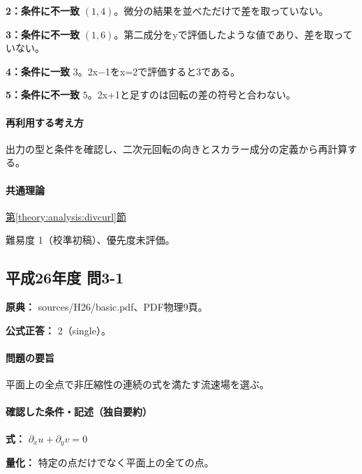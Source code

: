 \noindent\textbf{2：条件に不一致} \((1,4)\)。微分の結果を並べただけで差を取っていない。\par

\noindent\textbf{3：条件に不一致} \((1,6)\)。第二成分をyで評価したような値であり、差を取っていない。\par

\noindent\textbf{4：条件に一致} \(3\)。2x−1をx=\allowbreak{}2で評価すると3である。\par

\noindent\textbf{5：条件に不一致} \(5\)。2x+1と足すのは回転の差の符号と合わない。\par

\paragraph{再利用する考え方} 出力の型と条件を確認し、二次元回転の向きとスカラー成分の定義から再計算する。

\paragraph{共通理論} \hyperref[theory:analysis:divcurl]{第\ref*{theory:analysis:divcurl}節}

\par 難易度 1（校準初稿）、優先度未評価。

\subsection{平成26年度 問3-1}
\label{q:h26-reg-basic-3-1}

\noindent\textbf{原典：} sources/H26/basic.pdf、PDF物理9頁。

\textbf{公式正答：} 2（single）。

\paragraph{問題の要旨} 平面上の全点で非圧縮性の連続の式を満たす流速場を選ぶ。

\paragraph{確認した条件・記述（独自要約）}\mbox{}\par

\noindent\textbf{式：} \(\partial_xu+\partial_yv=0\)\par

\noindent\textbf{量化：} 特定の点だけでなく平面上の全ての点。\par

